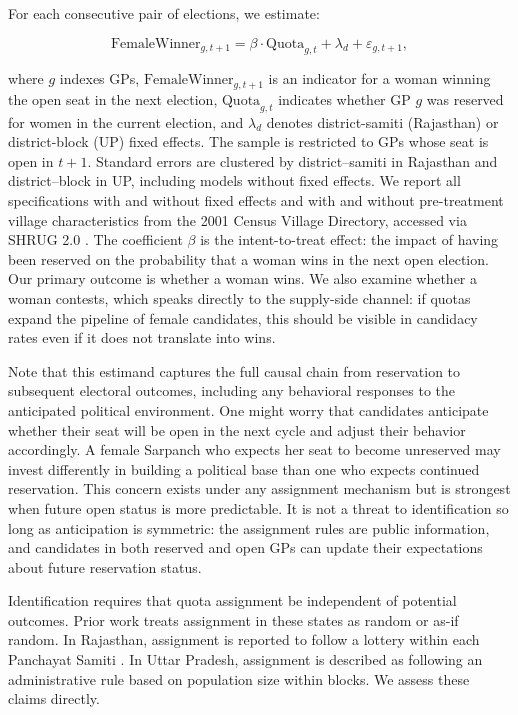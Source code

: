 \documentclass[12pt]{article}
\begin{document}
For each consecutive pair of elections, we estimate:

\begin{equation}\label{eq:estimation_eqn}
\text{FemaleWinner}_{g,t+1} = \beta \cdot \text{Quota}_{g,t} + \lambda_{d} + \varepsilon_{g,t+1},
\end{equation}

\noindent where $g$ indexes GPs, $\text{FemaleWinner}_{g,t+1}$ is an indicator for a woman winning the open seat in the next election, $\text{Quota}_{g,t}$ indicates whether GP $g$ was reserved for women in the current election, and $\lambda_d$ denotes district-samiti (Rajasthan) or district-block (UP) fixed effects. The sample is restricted to GPs whose seat is open in $t+1$. Standard errors are clustered by district--samiti in Rajasthan and district--block in UP, including models without fixed effects. We report all specifications with and without fixed effects and with and without pre-treatment village characteristics from the 2001 Census Village Directory, accessed via SHRUG 2.0 \citep{asher2019socioeconomic}. The coefficient $\beta$ is the intent-to-treat effect: the impact of having been reserved on the probability that a woman wins in the next open election. Our primary outcome is whether a woman wins. We also examine whether a woman contests, which speaks directly to the supply-side channel: if quotas expand the pipeline of female candidates, this should be visible in candidacy rates even if it does not translate into wins.

Note that this estimand captures the full causal chain from reservation to subsequent electoral outcomes, including any behavioral responses to the anticipated political environment. One might worry that candidates anticipate whether their seat will be open in the next cycle and adjust their behavior accordingly. A female Sarpanch who expects her seat to become unreserved may invest differently in building a political base than one who expects continued reservation. This concern exists under any assignment mechanism but is strongest when future open status is more predictable. It is not a threat to identification so long as anticipation is symmetric: the assignment rules are public information, and candidates in both reserved and open GPs can update their expectations about future reservation status.

Identification requires that quota assignment be independent of potential outcomes. Prior work treats assignment in these states as random or as-if random. In Rajasthan, assignment is reported to follow a lottery within each Panchayat Samiti \citep{chattopadhyay2004women, dunning2013ethnic, brule2023actually}. In Uttar Pradesh, assignment is described as following an administrative rule based on population size within blocks. We assess these claims directly.
\end{document}
